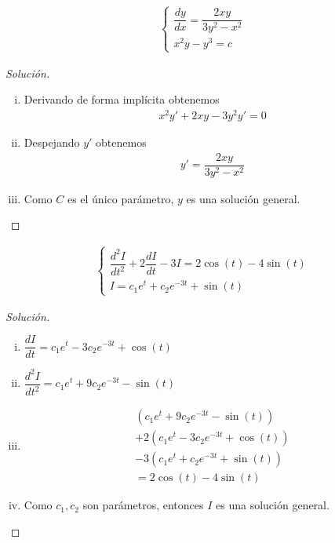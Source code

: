
\begin{align*}
	\begin{cases}
		\dfrac{dy}{dx}=\dfrac{2xy}{3y^{2}-x^{2}}\\
		x^{2}y-y^{3}=c
	\end{cases}
\end{align*}


\begin{proof}[Solución]
	\begin{enumerate}[(i)]
		\item Derivando de forma implícita obtenemos
		\begin{align*}
			x^{2}y'+2xy-3y^{2}y'=0
		\end{align*}
		\item Despejando $y'$ obtenemos
		\begin{align*}
			y'=\dfrac{2xy}{3y^{2}-x^{2}}
		\end{align*}
		\item Como $C$ es el único parámetro, $y$ es una solución general.
	\end{enumerate}
\end{proof}


\begin{align*}
	\label{problem 2.2:c}
	\begin{cases}
		\dfrac{d^{2}I}{dt^{2}}+2\dfrac{dI}{dt}-3I =
		2\cos(t)-4\sin(t)\\
		I = c_{1}e^{t}+c_{2}e^{-3t}+\sin(t)
	\end{cases}
\end{align*}


\begin{proof}[Solución]
	\begin{enumerate}[(i)]
		\item $ \dfrac{dI}{dt}
		=c_{1}e^{t}-3c_{2}e^{-3t}+\cos(t) $

		\item $ \dfrac{d^{2}I}{dt^{2}} =
		c_{1}e^{t}+9c_{2}e^{-3t}-\sin(t) $

		\item
		\begin{align*}
			\left(c_{1}e^{t}+9c_{2}e^{-3t}-\sin(t)\right)\\
			+2\left(c_{1}e^{t}-3c_{2}e^{-3t}+\cos(t)\right)\\
			-3\left(c_{1}e^{t}+c_{2}e^{-3t}+\sin(t)\right)\\
			=   2\cos(t)-4\sin(t)
		\end{align*}

		\item Como $ c_{1},c_{2} $ son parámetros, entonces $I$ es una solución general.
	\end{enumerate}
\end{proof}

